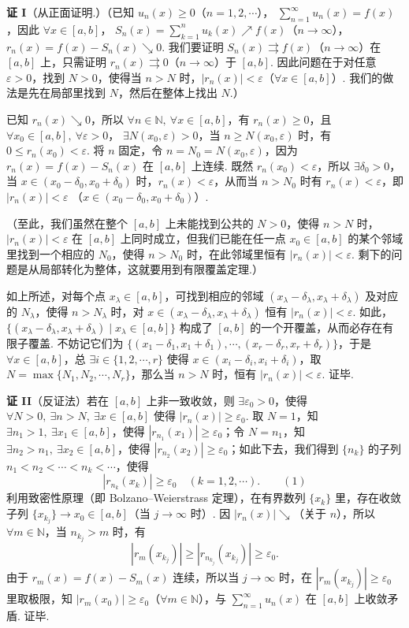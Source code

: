 \documentclass[UTF8, 12pt, fontset=fandol, oneside]{ctexart}
\begin{document}
\noindent\textbf{证 I}\quad （从正面证明.）（已知 $u_n(x)\ge0$（$n=1,2,\cdots$），
$\displaystyle\sum_{n=1}^{\infty}u_n(x)=f(x)$，因此 $\forall x\in[a,b]$，
$S_n(x)=\displaystyle\sum_{k=1}^{n}u_k(x)\nearrow f(x)$（$n\to\infty$），
$r_n(x)=f(x)-S_n(x)\searrow0$. 我们要证明
$S_n(x)\rightrightarrows f(x)$（$n\to\infty$）在 $[a,b]$ 上，只需证明
$r_n(x)\rightrightarrows0$（$n\to\infty$）于 $[a,b]$. 因此问题在于对任意 $\varepsilon>0$，找到
$N>0$，使得当 $n>N$ 时，$|r_n(x)|<\varepsilon$（$\forall x\in[a,b]$）. 我们的做法是先在局部里找到
$N$，然后在整体上找出 $N$.）

已知 $r_n(x)\searrow0$，所以 $\forall n\in\mathbb N,\ \forall x\in[a,b]$，有
$r_n(x)\ge0$，且 $\forall x_0\in[a,b],\ \forall\varepsilon>0$，
$\exists N(x_0,\varepsilon)>0$，当 $n\ge N(x_0,\varepsilon)$ 时，有
$0\le r_n(x_0)<\varepsilon$. 将 $n$ 固定，令 $n=N_0=N(x_0,\varepsilon)$，因为
$r_n(x)=f(x)-S_n(x)$ 在 $[a,b]$ 上连续. 既然 $r_n(x_0)<\varepsilon$，所以
$\exists\delta_0>0$，当 $x\in(x_0-\delta_0,x_0+\delta_0)$ 时，$r_n(x)<\varepsilon$，从而当
$n>N_0$ 时有 $r_n(x)<\varepsilon$，即 $|r_n(x)|<\varepsilon$
（$x\in(x_0-\delta_0,x_0+\delta_0)$）.

（至此，我们虽然在整个 $[a,b]$ 上未能找到公共的 $N>0$，使得 $n>N$ 时，
$|r_n(x)|<\varepsilon$ 在 $[a,b]$ 上同时成立，但我们已能在任一点 $x_0\in[a,b]$ 的某个邻域里找到一个相应的
$N_0$，使得 $n>N_0$ 时，在此邻域里恒有 $|r_n(x)|<\varepsilon$. 剩下的问题是从局部转化为整体，这就要用到有限覆盖定理.）

如上所述，对每个点 $x_\lambda\in[a,b]$，可找到相应的邻域
$(x_\lambda-\delta_\lambda,x_\lambda+\delta_\lambda)$ 及对应的 $N_\lambda$，使得
$n>N_\lambda$ 时，对 $x\in(x_\lambda-\delta_\lambda,x_\lambda+\delta_\lambda)$ 恒有
$|r_n(x)|<\varepsilon$. 如此，
$\{(x_\lambda-\delta_\lambda,x_\lambda+\delta_\lambda)\mid x_\lambda\in[a,b]\}$
构成了 $[a,b]$ 的一个开覆盖，从而必存在有限子覆盖. 不妨记它们为
$\{(x_1-\delta_1,x_1+\delta_1),\cdots,(x_r-\delta_r,x_r+\delta_r)\}$，于是
$\forall x\in[a,b]$，总 $\exists i\in\{1,2,\cdots,r\}$ 使得
$x\in(x_i-\delta_i,x_i+\delta_i)$，取 $N=\max\{N_1,N_2,\cdots,N_r\}$，那么当
$n>N$ 时，恒有 $|r_n(x)|<\varepsilon$. 证毕.

\noindent\textbf{证 II}\quad （反证法）若在 $[a,b]$ 上非一致收敛，则 $\exists\varepsilon_0>0$，使得
$\forall N>0,\ \exists n>N,\ \exists x\in[a,b]$ 使得 $|r_n(x)|\ge\varepsilon_0$. 取
$N=1$，知 $\exists n_1>1,\ \exists x_1\in[a,b]$，使得
$|r_{n_1}(x_1)|\ge\varepsilon_0$；令 $N=n_1$，知
$\exists n_2>n_1,\ \exists x_2\in[a,b]$，使得
$|r_{n_2}(x_2)|\ge\varepsilon_0$；如此下去，我们得到
$\{n_k\}$ 的子列 $n_1<n_2<\cdots<n_k<\cdots$，使得
\[
  |r_{n_k}(x_k)|\ge\varepsilon_0\quad(k=1,2,\cdots).
\qquad(1)
\]
利用致密性原理（即 Bolzano--Weierstrass 定理），在有界数列 $\{x_k\}$ 里，存在收敛子列
$\{x_{k_j}\}\to x_0\in[a,b]$（当 $j\to\infty$ 时）. 因
$|r_n(x)|\searrow$（关于 $n$），所以 $\forall m\in\mathbb N$，当 $n_{k_j}>m$ 时，有
\[
  |r_m(x_{k_j})|\ge |r_{n_{k_j}}(x_{k_j})|\ge\varepsilon_0.
\]
由于 $r_m(x)=f(x)-S_m(x)$ 连续，所以当 $j\to\infty$ 时，在
$|r_m(x_{k_j})|\ge\varepsilon_0$ 里取极限，知
$|r_m(x_0)|\ge\varepsilon_0$（$\forall m\in\mathbb N$），与
$\displaystyle\sum_{n=1}^{\infty}u_n(x)$ 在 $[a,b]$ 上收敛矛盾. 证毕.
\end{document}
